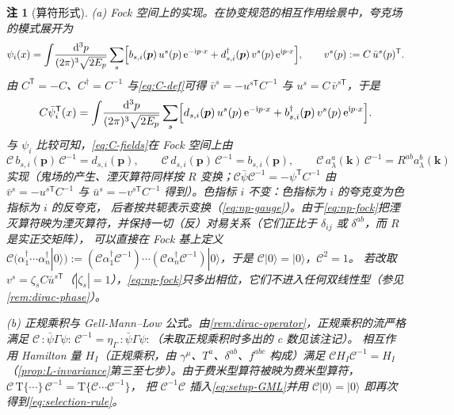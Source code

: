 \documentclass[UTF8,a4paper,11pt,fontset=fandol]{ctexart}
\theoremstyle{cplain}
\theoremstyle{cdefinition}
\theoremstyle{cremark}
\newtheorem{remark}[theorem]{注}
\numberwithin{equation}{section}
\newcommand{\dd}{\mathrm{d}}                         %
\newcommand{\tp}{\mathsf{T}}                         %
\newcommand{\Cop}{\mathcal{C}}                       %
\newcommand{\ii}{\mathrm{i}}                        %
\newcommand{\ee}{\mathrm{e}}                        %
\begin{document}
\begin{remark}[算符形式]\label{rem:np-operator}
(a) \emph{Fock 空间上的实现。}在协变规范的相互作用绘景中，夸克场的模式展开为
\begin{equation*}
\psi_i(x)=\int\!\frac{\dd^3p}{(2\pi)^3\sqrt{2E_p}}\sum_s\Bigl[b_{s,i}(\boldsymbol p)\,u^s(p)\,\ee^{-\ii p\cdot x}+d^\dagger_{s,i}(\boldsymbol p)\,v^s(p)\,\ee^{\ii p\cdot x}\Bigr],\qquad v^s(p):=C\,\bar u^s(p)^{\tp}.
\end{equation*}
由 $C^{\tp}=-C$、$C^\dagger=C^{-1}$ 与\cref{eq:C-def}可得 $\bar v^s=-u^{s\tp}C^{-1}$ 与 $u^s=C\,\bar v^{s\tp}$，于是
\begin{equation*}
C\bar\psi_i^{\tp}(x)=\int\!\frac{\dd^3p}{(2\pi)^3\sqrt{2E_p}}\sum_s\Bigl[d_{s,i}(\boldsymbol p)\,u^s(p)\,\ee^{-\ii p\cdot x}+b^\dagger_{s,i}(\boldsymbol p)\,v^s(p)\,\ee^{\ii p\cdot x}\Bigr].
\end{equation*}
与 $\psi_i$ 比较可知，\cref{eq:C-fields}在 Fock 空间上由
\begin{equation}\label{eq:np-fock}
\Cop\,b_{s,i}(\boldsymbol p)\,\Cop^{-1}=d_{s,i}(\boldsymbol p),\qquad \Cop\,d_{s,i}(\boldsymbol p)\,\Cop^{-1}=b_{s,i}(\boldsymbol p),\qquad \Cop\,a^a_\lambda(\boldsymbol k)\,\Cop^{-1}=R^{ab}a^b_\lambda(\boldsymbol k)
\end{equation}
实现（鬼场的产生、湮灭算符同样按 $R$ 变换；$\Cop\bar\psi\Cop^{-1}=-\psi^{\tp}C^{-1}$ 由 $\bar v^s=-u^{s\tp}C^{-1}$ 与 $\bar u^s=-v^{s\tp}C^{-1}$ 得到）。色指标 $i$ 不变：色指标为 $i$ 的夸克变为色指标为 $i$ 的反夸克，
后者按共轭表示变换（\cref{eq:np-gauge}）。由于\cref{eq:np-fock}把湮灭算符映为湮灭算符，并保持一切（反）对易关系（它们正比于 $\delta_{ij}$ 或 $\delta^{ab}$，而 $R$ 是实正交矩阵），
可以直接在 Fock 基上定义 $\Cop\bigl(\alpha_1^\dagger\cdots\alpha_n^\dagger|0\rangle\bigr):=(\Cop\alpha_1^\dagger\Cop^{-1})\cdots(\Cop\alpha_n^\dagger\Cop^{-1})|0\rangle$，于是 $\Cop|0\rangle=|0\rangle$，$\Cop^2=1$。
若改取 $v^s=\zeta_sC\bar u^{s\tp}$（$|\zeta_s|=1$），\cref{eq:np-fock}只多出相位，它们不进入任何双线性型（参见\cref{rem:dirac-phase}）。

(b) \emph{正规乘积与 Gell-Mann--Low 公式。}由\cref{rem:dirac-operator}，正规乘积的流严格满足 $\Cop\,{:}\bar\psi\Gamma\psi{:}\,\Cop^{-1}=\eta_\Gamma\,{:}\bar\psi\Gamma\psi{:}$（未取正规乘积时多出的 c 数见该注记）。
相互作用 Hamilton 量 $H_I$（正规乘积，由 $\gamma^\mu$、$T^a$、$\delta^{ab}$、$f^{abc}$ 构成）满足
$\Cop H_I\Cop^{-1}=H_I$（\cref{prop:L-invariance}第三至七步）。由于费米型算符被映为费米型算符，$\Cop\,\mathrm T\{\cdots\}\,\Cop^{-1}=\mathrm T\{\Cop\cdots\Cop^{-1}\}$，
把 $\Cop^{-1}\Cop$ 插入\cref{eq:setup-GML}并用 $\Cop|0\rangle=|0\rangle$ 即再次得到\cref{eq:selection-rule}。


\end{remark}
\end{document}

